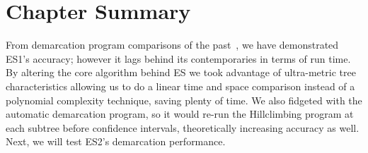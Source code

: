%
%
%
%


\section{Chapter Summary}
From demarcation program comparisons of the past~\cite{carlo}, we have demonstrated ES1's accuracy; however it lags behind its contemporaries in terms of run time.
By altering the core algorithm behind ES we took advantage of ultra-metric tree characteristics allowing us to do a linear time and space comparison instead of a polynomial complexity technique, saving plenty of time.
We also fidgeted with the automatic demarcation program, so it would re-run the Hillclimbing program at each subtree before confidence intervals, theoretically increasing accuracy as well.
Next, we will test ES2's demarcation performance.

